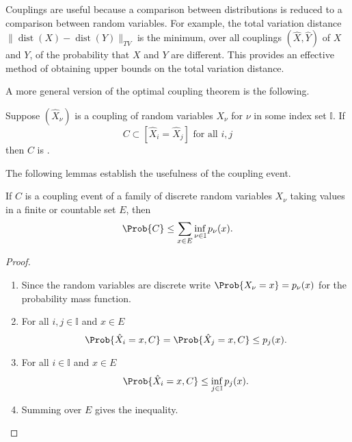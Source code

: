 \documentclass[12pt]{article}
\begin{document}
\begin{remark}
    Couplings are useful because a comparison between distributions is
    reduced to a comparison between random variables.  For example, the
    total variation distance \( \|
    \operatorname{dist}
    (X) -
    \operatorname{dist}
    (Y) \|_{TV} \) is the minimum, over all couplings \( (\hat{X}, \hat{Y}
    ) \) of \( X \) and \( Y \), of the probability that \( X \) and \(
    Y \) are different.  This provides an effective method of obtaining
    upper bounds on the total variation distance.
\end{remark}

A more general version of the optimal coupling theorem is the following.

\begin{definition}
    Suppose \( (\hat{X}_{\nu}) \) is a coupling of random variables \( X_
    {\nu} \) for \( \nu \) in some index set \( \mathbb{I} \).  If
    \[
        C \subset [ \hat{X}_i = \hat{X}_j] \text{ for all } i,j
    \] then \( C \) is .
\end{definition}

The following lemmas establish the usefulness of the coupling event.

\begin{lemma}
    If \( C \) is a coupling event of a family of discrete random
    variables \( X_{\nu} \) taking values in a finite or countable set \(
    E \), then
    \[
        \Prob{C} \le \sum\limits_{x \in E} \inf_{\nu \in \mathbb{I}} p_\nu
        (x).
    \]
\end{lemma}

\begin{proof}
    \begin{enumerate}
        \item
            Since the random variables are discrete write \( \Prob{X_{\nu}
            = x} = p_{\nu}(x) \) for the probability mass function.
        \item
            For all \( i, j \in \mathbb{I} \) and \( x \in E \)
            \[
                \Prob{\hat{X}_i = x, C} = \Prob{\hat{X}_j = x, C} \le p_j
                (x).
            \]
        \item
            For all \( i\in \mathbb{I} \) and \( x \in E \)
            \[
                \Prob{\hat{X}_i = x, C} \le \inf_{j \in \mathbb{I}} p_j(x).
            \]
        \item
            Summing over \( E \) gives the inequality.
    \end{enumerate}
\end{proof}
\end{document}
